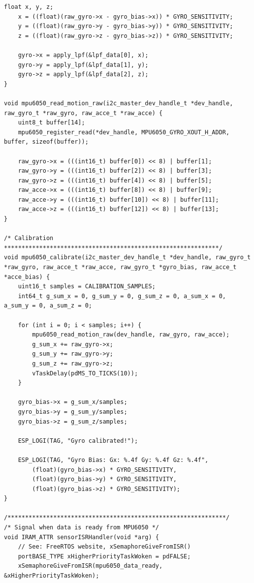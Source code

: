 \begin{lstlisting}[caption={sensors.c}]
    float x, y, z; 
    x = ((float)(raw_gyro->x - gyro_bias->x)) * GYRO_SENSITIVITY;
    y = ((float)(raw_gyro->y - gyro_bias->y)) * GYRO_SENSITIVITY;
    z = ((float)(raw_gyro->z - gyro_bias->z)) * GYRO_SENSITIVITY;

    gyro->x = apply_lpf(&lpf_data[0], x);
    gyro->y = apply_lpf(&lpf_data[1], y);
    gyro->z = apply_lpf(&lpf_data[2], z);
}

void mpu6050_read_motion_raw(i2c_master_dev_handle_t *dev_handle, raw_gyro_t *raw_gyro, raw_acce_t *raw_acce) {
    uint8_t buffer[14];
    mpu6050_register_read(*dev_handle, MPU6050_GYRO_XOUT_H_ADDR, buffer, sizeof(buffer));

    raw_gyro->x = (((int16_t) buffer[0]) << 8) | buffer[1];
    raw_gyro->y = (((int16_t) buffer[2]) << 8) | buffer[3];
    raw_gyro->z = (((int16_t) buffer[4]) << 8) | buffer[5];
    raw_acce->x = (((int16_t) buffer[8]) << 8) | buffer[9];
    raw_acce->y = (((int16_t) buffer[10]) << 8) | buffer[11];
    raw_acce->z = (((int16_t) buffer[12]) << 8) | buffer[13];
}

/* Calibration *************************************************************/
void mpu6050_calibrate(i2c_master_dev_handle_t *dev_handle, raw_gyro_t *raw_gyro, raw_acce_t *raw_acce, raw_gyro_t *gyro_bias, raw_acce_t *acce_bias) {
    uint16_t samples = CALIBRATION_SAMPLES;
    int64_t g_sum_x = 0, g_sum_y = 0, g_sum_z = 0, a_sum_x = 0, a_sum_y = 0, a_sum_z = 0;

    for (int i = 0; i < samples; i++) {
        mpu6050_read_motion_raw(dev_handle, raw_gyro, raw_acce);
        g_sum_x += raw_gyro->x;
        g_sum_y += raw_gyro->y;
        g_sum_z += raw_gyro->z;
        vTaskDelay(pdMS_TO_TICKS(10)); 
    }

    gyro_bias->x = g_sum_x/samples;
    gyro_bias->y = g_sum_y/samples;
    gyro_bias->z = g_sum_z/samples;

    ESP_LOGI(TAG, "Gyro calibrated!");

    ESP_LOGI(TAG, "Gyro Bias: Gx: %.4f Gy: %.4f Gz: %.4f",
        (float)(gyro_bias->x) * GYRO_SENSITIVITY,
        (float)(gyro_bias->y) * GYRO_SENSITIVITY,
        (float)(gyro_bias->z) * GYRO_SENSITIVITY);
}

/**************************************************************/
/* Signal when data is ready from MPU6050 */
void IRAM_ATTR sensorISRHandler(void *arg) {
    // See: FreeRTOS website, xSemaphoreGiveFromISR()
    portBASE_TYPE xHigherPriorityTaskWoken = pdFALSE;
    xSemaphoreGiveFromISR(mpu6050_data_ready, &xHigherPriorityTaskWoken);


\end{lstlisting}
